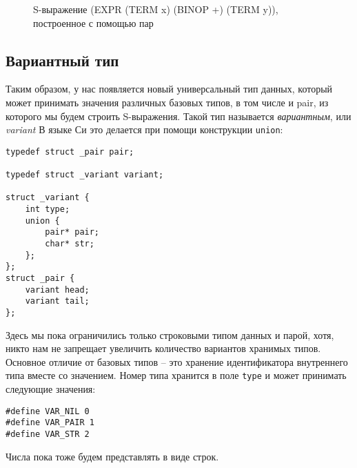 \documentclass[10pt]{report}
\begin{document}
\begin{figure}[b]
\caption{S-выражение (EXPR (TERM x) (BINOP +) (TERM y)), построенное с помощью пар}
\label{fig:pairs}
\end{figure}
\subsection{Вариантный тип}
Таким образом, у нас появляется новый универсальный тип данных, который может принимать значения различных базовых типов, в том числе и pair, из которого мы будем строить S-выражения. Такой тип называется \emph{вариантным}, или \emph{variant} В языке Си это делается при помощи конструкции \texttt{union}:
\begin{lstlisting}[firstnumber=8, caption=nlisp.h -- тип variant]
typedef struct _pair pair;

typedef struct _variant variant; 

struct _variant {
	int type;
	union {
		pair* pair;
		char* str;
	};
};
struct _pair {
	variant head;
	variant tail;
};
\end{lstlisting}
Здесь мы пока ограничились только строковыми типом данных и парой, хотя, никто нам не запрещает увеличить количество вариантов хранимых типов. Основное отличие от базовых типов -- это хранение идентификатора внутреннего типа вместе со значением. Номер типа хранится в поле \texttt{type} и может принимать следующие значения:
\begin{lstlisting}[firstnumber=4, caption=nplisp.h -- идентификаторы вариантов типов]
#define VAR_NIL 0
#define VAR_PAIR 1
#define VAR_STR 2
\end{lstlisting}
Числа пока тоже будем представлять в виде строк.
\end{document}
